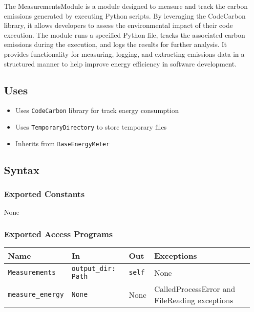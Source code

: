 \documentclass[12pt, titlepage]{article}
\begin{document}
The MeasurementsModule is a module designed to measure and track the carbon emissions generated by executing Python scripts. By leveraging the CodeCarbon library, it allows developers to assess the environmental impact of their code execution. The module runs a specified Python file, tracks the associated carbon emissions during the execution, and logs the results for further analysis. It provides functionality for measuring, logging, and extracting emissions data in a structured manner to help improve energy efficiency in software development.

\subsection{Uses}

\begin{itemize}
    \item Uses \texttt{CodeCarbon} library for track energy consumption
    \item Uses \texttt{TemporaryDirectory} to store temporary files
    \item Inherits from \texttt{BaseEnergyMeter}
\end{itemize}

\subsection{Syntax}

\subsubsection{Exported Constants}
None

\subsubsection{Exported Access Programs}

\begin{center}
\begin{tabularx}{\linewidth}{|l|>{\raggedright\arraybackslash}X|l|l|}
\hline
\textbf{Name} & \textbf{In} & \textbf{Out} & \textbf{Exceptions} \\
\hline
\texttt{Measurements} & \texttt{output\_dir: Path} & \texttt{self} & None \\
\hline
\texttt{measure\_energy} & \texttt{None} & None & CalledProcessError and FileReading exceptions \\
\hline
\end{tabularx}
\end{center}
\end{document}
